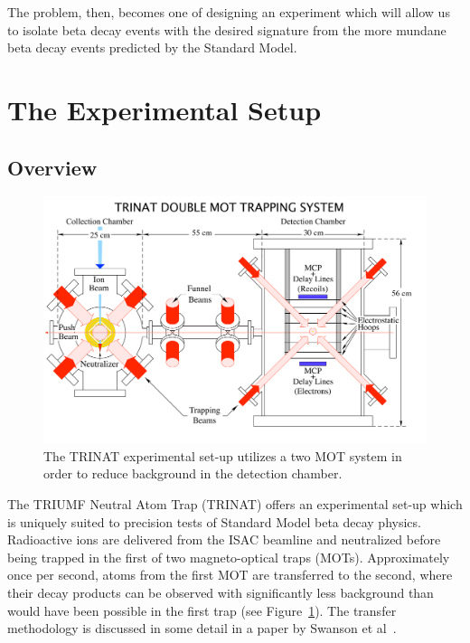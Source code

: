 The problem, then, becomes one of designing an experiment which will allow us to isolate beta decay events with the desired signature from the more mundane beta decay events predicted by the Standard Model.  


%
\section{The Experimental Setup}
\label{setup}

\color{usedcolor}
\subsection{Overview}
\label{overview}

\begin{figure}[t!h]
	\centering
	\includegraphics[width=.999\linewidth]
	{Figures/doublemot4.pdf}
	\caption{The TRINAT experimental set-up utilizes a two MOT system in order to reduce background in the detection chamber.}	
	\label{fig:doublemot}
\end{figure}

The TRIUMF Neutral Atom Trap (TRINAT) offers an experimental set-up which is uniquely suited to precision tests of Standard Model beta decay physics.  Radioactive ions are delivered from the ISAC beamline and neutralized before being trapped in the first of two magneto-optical traps (MOTs).  Approximately once per second, atoms from the first MOT are transferred to the second, where their decay products can be observed with significantly less background than would have been possible in the first trap (see Figure~\ref{fig:doublemot}).  The transfer methodology is discussed in some detail in a paper by Swanson et al~\cite{swanson}.


